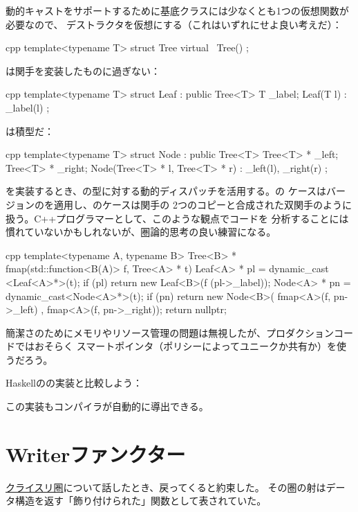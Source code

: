 動的キャストをサポートするために基底クラスには少なくとも1つの仮想関数が必要なので、
デストラクタを仮想にする（これはいずれにせよ良い考えだ）：

\begin{snip}{cpp}
template<typename T>
struct Tree {
    virtual ~Tree() {}
};
\end{snip}
は関手を変装したものに過ぎない：

\begin{snip}{cpp}
template<typename T>
struct Leaf : public Tree<T> {
    T _label;
    Leaf(T l) : _label(l) {}
};
\end{snip}
は積型だ：

\begin{snip}{cpp}
template<typename T>
struct Node : public Tree<T> {
    Tree<T> * _left;
    Tree<T> * _right;
    Node(Tree<T> * l, Tree<T> * r) : _left(l), _right(r) {}
};
\end{snip}
を実装するとき、の型に対する動的ディスパッチを活用する。の
ケースはバージョンのを適用し、のケースは関手の
2つのコピーと合成された双関手のように扱う。C++プログラマーとして、このような観点でコードを
分析することには慣れていないかもしれないが、圏論的思考の良い練習になる。

\begin{snip}{cpp}
template<typename A, typename B>
Tree<B> * fmap(std::function<B(A)> f, Tree<A> * t) {
    Leaf<A> * pl = dynamic_cast <Leaf<A>*>(t);
    if (pl)
        return new Leaf<B>(f (pl->_label));
    Node<A> * pn = dynamic_cast<Node<A>*>(t);
    if (pn)
        return new Node<B>( fmap<A>(f, pn->_left)
                          , fmap<A>(f, pn->_right));
    return nullptr;
}
\end{snip}
簡潔さのためにメモリやリソース管理の問題は無視したが、プロダクションコードではおそらく
スマートポインタ（ポリシーによってユニークか共有か）を使うだろう。

Haskellのの実装と比較しよう：

この実装もコンパイラが自動的に導出できる。

\section{Writerファンクター}

\hyperref[kleisli-categories]{クライスリ圏}について話したとき、戻ってくると約束した。
その圏の射はデータ構造を返す「飾り付けられた」関数として表されていた。

